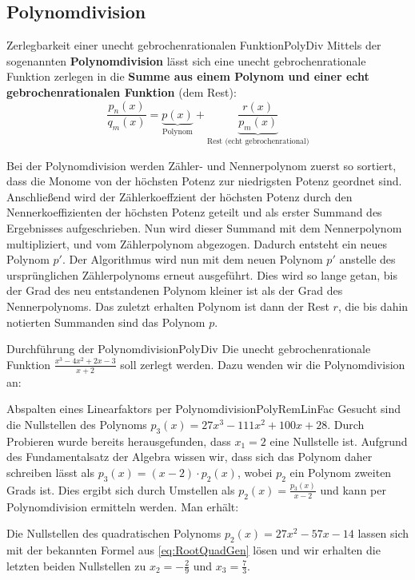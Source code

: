 \subsection{Polynomdivision}

\begin{statement}{Zerlegbarkeit einer unecht gebrochenrationalen Funktion}{PolyDiv}
    Mittels der sogenannten \textbf{Polynomdivision} lässt sich eine unecht gebrochenrationale Funktion zerlegen in die \textbf{Summe aus einem Polynom und einer echt gebrochenrationalen Funktion} (dem Rest):
    $$
        \frac{p_n(x)}{q_m(x)} = \underbrace{p(x)}_{\text{Polynom}} + \underbrace{\frac{r(x)}{p_m(x)}}_{\text{Rest (echt gebrochenrational)}}
    $$
\end{statement}

Bei der Polynomdivision werden Zähler- und Nennerpolynom zuerst so sortiert, dass die Monome von der höchsten Potenz zur niedrigsten Potenz geordnet sind. Anschließend wird der Zählerkoeffzient der höchsten Potenz durch den Nennerkoeffizienten der höchsten Potenz geteilt und als erster Summand des Ergebnisses aufgeschrieben. Nun wird dieser Summand mit dem Nennerpolynom multipliziert, und vom Zählerpolynom abgezogen. Dadurch entsteht ein neues Polynom $p'$. Der Algorithmus wird nun mit dem neuen Polynom $p'$ anstelle des ursprünglichen Zählerpolynoms erneut ausgeführt. Dies wird so lange getan, bis der Grad des neu entstandenen Polynom kleiner ist als der Grad des Nennerpolynoms. Das zuletzt erhalten Polynom ist dann der Rest $r$, die bis dahin notierten Summanden sind das Polynom $p$.

\begin{example}{Durchführung der Polynomdivision}{PolyDiv}
    Die unecht gebrochenrationale Funktion $\frac{x^3-4x^2+2x-3}{x+2}$ soll zerlegt werden. Dazu wenden wir die Polynomdivision an:

\end{example}

\begin{example}{Abspalten eines Linearfaktors per Polynomdivision}{PolyRemLinFac}
    Gesucht sind die Nullstellen des Polynoms $p_3(x) = 27x^3-111x^2+100x+28$. Durch Probieren wurde bereits herausgefunden, dass $x_1 =2$ eine Nullstelle ist. Aufgrund des Fundamentalsatz der Algebra wissen wir, dass sich das Polynom daher schreiben lässt als $p_3(x) = (x-2) \cdot p_2(x)$, wobei $p_2$ ein Polynom zweiten Grads ist. Dies ergibt sich durch Umstellen als $p_2(x) = \frac{p_3(x)}{x-2}$ und kann per Polynomdivision ermitteln werden. Man erhält:


    Die Nullstellen des quadratischen Polynoms $p_2(x) = 27x^2-57x-14$ lassen sich mit der bekannten Formel aus \ref{eq:RootQuadGen} lösen und wir erhalten die letzten beiden Nullstellen zu $x_2=-\frac{2}{9}$ und $x_3=\frac{7}{3}$.
\end{example}

